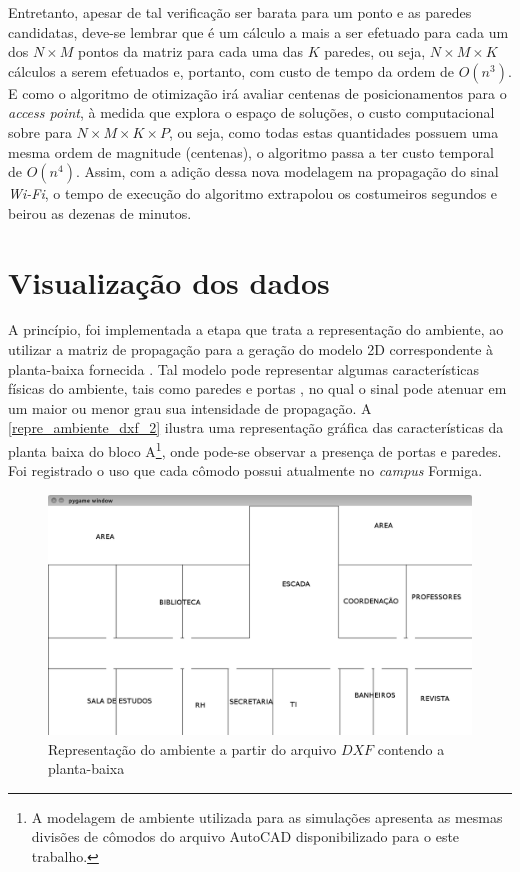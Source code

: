 \documentclass[
	12pt,				%
	twoside,			%
	a4paper,			%
	english,			%
	french,				%
	spanish,			%
	brazil				%
	]{abntex2}
\begin{document}
Entretanto, apesar de tal verificação ser barata para um ponto e as
paredes candidatas, deve-se lembrar que é um cálculo a mais a ser
efetuado para cada um dos \(N \times M\) pontos da matriz para cada uma
das \(K\) paredes, ou seja, \(N \times M \times K\) cálculos a serem
efetuados e, portanto, com custo de tempo da ordem de \(O(n^{3})\). E
como o algoritmo de otimização irá avaliar centenas de posicionamentos
para o \emph{access point}, à medida que explora o espaço de soluções, o
custo computacional sobre para \(N \times M \times K \times P\), ou
seja, como todas estas quantidades possuem uma mesma ordem de magnitude
(centenas), o algoritmo passa a ter custo temporal de \(O(n^{4})\).
Assim, com a adição dessa nova modelagem na propagação do sinal
\emph{Wi-Fi}, o tempo de execução do algoritmo extrapolou os costumeiros
segundos e beirou as dezenas de minutos.

\section{Visualização dos dados}\label{visualizauxe7uxe3o-dos-dados}

A princípio, foi implementada a etapa que trata a representação do
ambiente, ao utilizar a matriz de propagação para a geração do modelo 2D
correspondente à planta-baixa fornecida \cite{KASE,THAKUR}. Tal modelo
pode representar algumas características físicas do ambiente, tais como
paredes e portas \cite{MARSCHALLINGER}, no qual o sinal pode atenuar em
um maior ou menor grau sua intensidade de propagação. A
\autoref{repre_ambiente_dxf_2} ilustra uma representação gráfica das
características da planta baixa do bloco A\footnote{A modelagem de
  ambiente utilizada para as simulações apresenta as mesmas divisões de
  cômodos do arquivo AutoCAD disponibilizado para o este trabalho.},
onde pode-se observar a presença de portas e paredes. Foi registrado o
uso que cada cômodo possui atualmente no \emph{campus} Formiga.

\begin{figure}[ht]
    \caption{\label{repre_ambiente_dxf_2} Representação do ambiente a partir do arquivo $DXF$ contendo a planta-baixa}
    \begin{center}
        \includegraphics[scale=0.4]{imagens/planta-labels.jpg}
    \end{center}
\end{figure}
\end{document}

